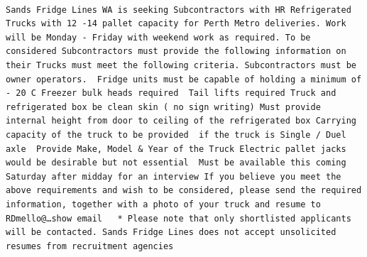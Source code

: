 \documentclass[11pt,a4paper,]{article}
\begin{document}
\begin{verbatim}
                                                                                                                                                                                                                                          Sands Fridge Lines WA is seeking Subcontractors with HR Refrigerated Trucks with 12 -14 pallet capacity for Perth Metro deliveries. Work will be Monday - Friday with weekend work as required. To be considered Subcontractors must provide the following information on their Trucks must meet the following criteria. Subcontractors must be owner operators.  Fridge units must be capable of holding a minimum of - 20 C Freezer bulk heads required  Tail lifts required Truck and refrigerated box be clean skin ( no sign writing) Must provide internal height from door to ceiling of the refrigerated box Carrying capacity of the truck to be provided  if the truck is Single / Duel axle  Provide Make, Model & Year of the Truck Electric pallet jacks would be desirable but not essential  Must be available this coming Saturday after midday for an interview If you believe you meet the above requirements and wish to be considered, please send the required information, together with a photo of your truck and resume to RDmello@…show email   * Please note that only shortlisted applicants will be contacted. Sands Fridge Lines does not accept unsolicited resumes from recruitment agencies 

\end{verbatim}
\end{document}
